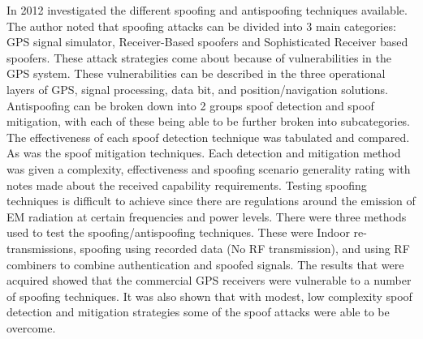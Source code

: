 In 2012 \textcite{RN6} investigated the different spoofing and antispoofing techniques available. The author noted that spoofing attacks can be divided into 3 main categories:
GPS signal simulator, Receiver-Based spoofers and Sophisticated Receiver based spoofers. These attack strategies come about because of vulnerabilities in the GPS system.
These vulnerabilities can be described in the three operational layers of GPS, signal processing, data bit, and position/navigation solutions.
Antispoofing can be broken down into 2 groups spoof detection and spoof mitigation, with each of these being able to be further broken into subcategories.
The effectiveness of each spoof detection technique was tabulated and compared. As was the spoof mitigation techniques. Each detection and mitigation
method was given a complexity, effectiveness and spoofing scenario generality rating with notes made about the received capability requirements.
Testing spoofing techniques is difficult to achieve since there are regulations around the emission of EM radiation at certain frequencies and power levels.
There were three methods used to test the spoofing/antispoofing techniques. These were Indoor re-transmissions, spoofing using recorded data (No RF transmission), and
using RF combiners to combine authentication and spoofed signals.
The results that were acquired showed that the commercial GPS receivers were vulnerable to a number of spoofing techniques. It was also
shown that with modest, low complexity spoof detection and mitigation strategies some of the spoof attacks were able to be overcome.
